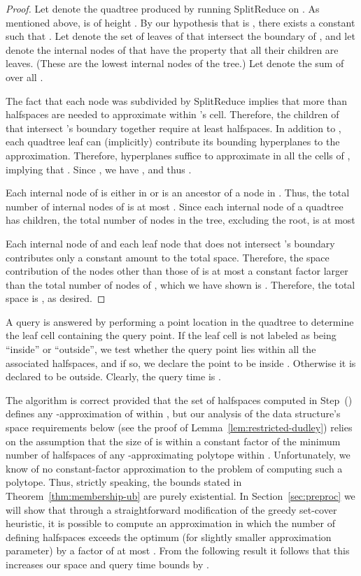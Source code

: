 \documentclass[11pt]{article}   \usepackage[letterpaper,hmargin=2.1cm,vmargin=3cm]{geometry}
\newcommand{\alg}{\textrm{SplitReduce}}
\begin{document}
\begin{proof}
Let  denote the quadtree produced by running {\alg} on . As mentioned above,  is of height . By our hypothesis that  is , there exists a constant  such that . Let  denote the set of leaves of  that intersect the boundary of , and let  denote the internal nodes of  that have the property that all their children are leaves. (These are the lowest internal nodes of the tree.) Let  denote the sum of  over all .

The fact that each node  was subdivided by {\alg} implies that more than  halfspaces are needed to approximate  within 's cell. Therefore, the children of  that intersect 's boundary together require at least  halfspaces. In addition to , each quadtree leaf  can (implicitly) contribute its  bounding hyperplanes to the approximation. Therefore,  hyperplanes suffice to approximate  in all the cells of , implying that . Since , we have , and thus . 

Each internal node of  is either in  or is an ancestor of a node in . Thus, the total number of internal nodes of  is at most . Since each internal node of a quadtree has  children, the total number of nodes in the tree, excluding the root, is at most

Each internal node of  and each leaf node that does not intersect 's boundary contributes only a constant amount to the total space. Therefore, the space contribution of the nodes other than those of  is at most a constant factor larger than the total number of nodes of , which we have shown is . Therefore, the total space is , as desired.
\end{proof}


A query is answered by performing a point location in the quadtree to determine the leaf cell containing the query point. If the leaf cell is not labeled as being ``inside'' or ``outside'', we test whether the query point lies within all the associated halfspaces, and if so, we declare the point to be inside . Otherwise it is declared to be outside. Clearly, the query time is .

The algorithm is correct provided that the set of halfspaces  computed in Step~(\stepapx) defines any -approximation of  within , but our analysis of the data structure's space requirements below (see the proof of Lemma~\ref{lem:restricted-dudley}) relies on the assumption that the size of  is within a constant factor of the minimum number of halfspaces of any -approximating polytope within . Unfortunately, we know of no constant-factor approximation to the problem of computing such a polytope. Thus, strictly speaking, the bounds stated in Theorem~\ref{thm:membership-ub} are purely existential. In Section~\ref{sec:preproc} we will show that through a straightforward modification of the greedy set-cover heuristic, it is possible to compute an approximation in which the number of defining halfspaces exceeds the optimum (for slightly smaller approximation parameter) by a factor of at most . From the following result it follows that this increases our space and query time bounds by .
\end{document}
